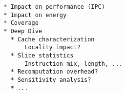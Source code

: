 \begin{verbatim}
  * Impact on performance (IPC)
  * Impact on energy
  * Coverage
  * Deep Dive
    * Cache characterization 
        Locality impact?
    * Slice statistics 
        Instruction mix, length, ...
    * Recomputation overhead?
    * Sensitivity analysis?
    * ...
 \end{verbatim}
